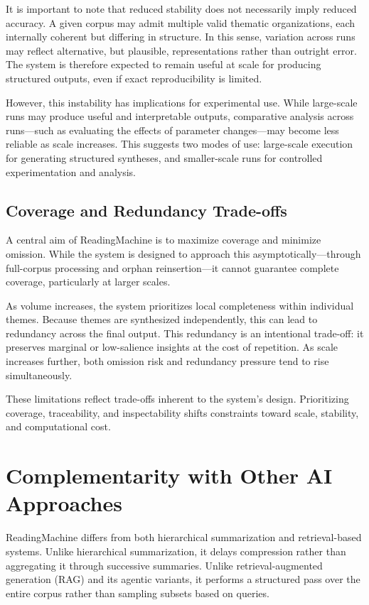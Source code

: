 \documentclass[
  11pt,
]{article}
\begin{document}
It is important to note that reduced stability does not necessarily
imply reduced accuracy. A given corpus may admit multiple valid thematic
organizations, each internally coherent but differing in structure. In
this sense, variation across runs may reflect alternative, but
plausible, representations rather than outright error. The system is
therefore expected to remain useful at scale for producing structured
outputs, even if exact reproducibility is limited.

However, this instability has implications for experimental use. While
large-scale runs may produce useful and interpretable outputs,
comparative analysis across runs---such as evaluating the effects of
parameter changes---may become less reliable as scale increases. This
suggests two modes of use: large-scale execution for generating
structured syntheses, and smaller-scale runs for controlled
experimentation and analysis.

\subsection{Coverage and Redundancy Trade-offs}\label{coverage-and-redundancy-trade-offs}

A central aim of ReadingMachine is to maximize coverage and minimize
omission. While the system is designed to approach this
asymptotically---through full-corpus processing and orphan
reinsertion---it cannot guarantee complete coverage, particularly at
larger scales.

As volume increases, the system prioritizes local completeness within
individual themes. Because themes are synthesized independently, this
can lead to redundancy across the final output. This redundancy is an
intentional trade-off: it preserves marginal or low-salience insights at
the cost of repetition. As scale increases further, both omission risk
and redundancy pressure tend to rise simultaneously.

These limitations reflect trade-offs inherent to the system's design.
Prioritizing coverage, traceability, and inspectability shifts
constraints toward scale, stability, and computational cost.

\section{Complementarity with Other AI Approaches}\label{complementarity-with-other-ai-approaches}

ReadingMachine differs from both hierarchical summarization and
retrieval-based systems. Unlike hierarchical summarization, it delays
compression rather than aggregating it through successive summaries.
Unlike retrieval-augmented generation (RAG) and its agentic variants, it
performs a structured pass over the entire corpus rather than sampling
subsets based on queries.
\end{document}

